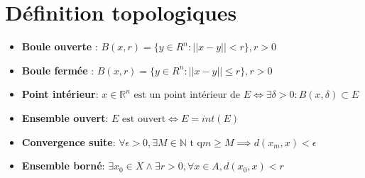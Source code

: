 \documentclass[12pt]{book}
\let\Bbb\mathbb
\theoremstyle{definition}
\begin{document}
\section{Définition topologiques}
\begin{itemize}
    \item \textbf{Boule ouverte} : $B(x, r) = \{y \in R^n : || x - y || < r\}, r > 0$
    \item \textbf{Boule fermée} : $B(x, r) = \{y \in R^n : || x - y || \leq r\}, r > 0$
    \item \textbf{Point intérieur}: $x \in \Bbb R^n \text{ est un point intérieur de } E \iff \exists \delta > 0 : B(x, \delta) \subset E$
    \item \textbf{Ensemble ouvert}: $E\text{ est ouvert} \iff E = int(E)$
    \item \textbf{Convergence suite}: $\forall \epsilon > 0, \exists M \in \Bbb N \text{ t q} m \geq M \implies d(x_m, x) < \epsilon$
    \item \textbf{Ensemble borné}: $\exists x_0 \in X \land \exists r > 0, \forall x \in A, d(x_0, x) < r$
\end{itemize}
\end{document}
